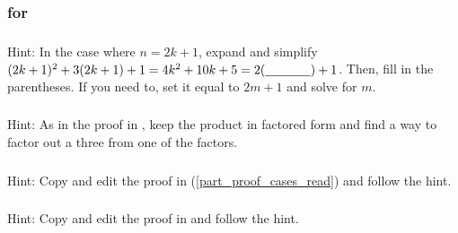 \subsubsection{\answers for  \subpffcases}

\subsubsection*{ \answers}
    Hint: In the case where $n=2k+1$, expand and simplify $(2k+1)^2+3(2k+1)+1=4k^2+10k+5 = 2(\underline{\hspace{0.5in}})+1$.  Then, fill in the parentheses.  If you need to, set it equal to $2m+1$ and solve for $m$.
    
\subsubsection*{ \answers}
    Hint: As in the proof in , keep the product in factored form and find a way to factor out a three from one of the factors.
    
\subsubsection*{ \answers}
    Hint: Copy and edit the proof in  (\ref{part_proof_cases_read}) and follow the hint.
    
\subsubsection*{ \answers}
    Hint: Copy and edit the proof in  and follow the hint.

